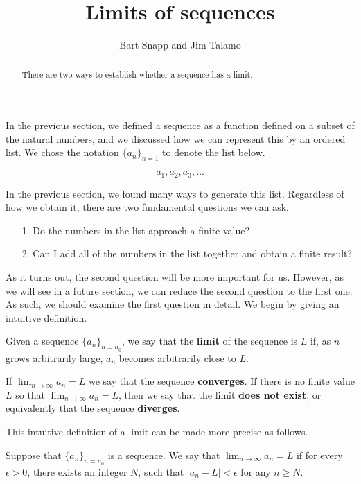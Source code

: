 \documentclass{ximera}
\author{Bart Snapp and Jim Talamo}
\title[Dig-In:]{Limits of sequences}
\begin{document}
\begin{abstract}
There are two ways to establish whether a sequence has a limit.
\end{abstract}
\maketitle

In the previous section, we defined a sequence as a function defined on a subset of the natural numbers, and we discussed how we can represent this by an ordered list.  We chose the notation $\{a_n\}_{n=1}$ to denote the list below.

\[
a_1, a_2, a_3 , \ldots
\]

In the previous section, we found many ways to generate this list.  Regardless of how we obtain it, there are two fundamental questions we can ask.
\begin{itemize}
\item[1.] Do the numbers in the list approach a finite value?
\item[2.] Can I add all of the numbers in the list together and obtain a finite result?
\end{itemize}

As it turns out, the second question will be more important for us.  However, as we will see in a future section, we can reduce the second question to the first one.  As such, we should examine the first question in detail.  We begin by giving an intuitive definition.

\begin{definition}
  Given a sequence $\{a_n\}_{n =n_0}$, we say that the \textbf{limit} of the sequence is $L$ if, as $n$ grows arbitrarily large, $a_n$ becomes arbitrarily close to $L$. 
  
If $\lim_{n\to\infty}a_n=L$ we say that the sequence
\textbf{converges}.
If there is no finite value $L$ so that $\lim_{n\to\infty}a_n = L$,
then we say that the limit \textbf{does not exist}, or equivalently that
the sequence \textbf{diverges}.
\end{definition}

This intuitive definition of a limit can be made more precise as follows.

\begin{definition}
\label{definition:limit-of-a-sequence}
Suppose that $\{a_n\}_{n=n_0}$ is a sequence.  We say that
$\lim_{n\to \infty}a_n=L$ if for every $\epsilon>0$, there exists an integer $N$, such that $|a_n-L|<\epsilon$ for any $n \geq N$.
\end{definition}
\end{document}
